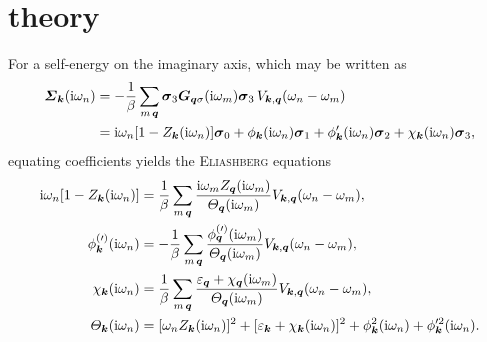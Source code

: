 
\chapter{ theory}

For a self-energy on the imaginary axis, which may be written as
%
\begin{align*}
    \boldsymbol {\varSigma}_{\boldsymbol k}(\mathrm i \omega_n) &= -\frac 1 \beta \sum_{m \, \boldsymbol q}
    \boldsymbol \sigma_3 \boldsymbol G_{\boldsymbol q \sigma}(\mathrm i \omega_m) \boldsymbol \sigma_3 \,
    V_{\boldsymbol k, \boldsymbol q}(\omega_n - \omega_m)
    \\
    &= \mathrm i \omega_n [1 - Z_{\boldsymbol k}(\mathrm i \omega_n)] \boldsymbol \sigma_0
    + \phi_{\boldsymbol k}(\mathrm i \omega_n) \boldsymbol \sigma_1
    + \phi'_{\boldsymbol k}(\mathrm i \omega_n) \boldsymbol \sigma_2
    + \chi_{\boldsymbol k}(\mathrm i \omega_n) \boldsymbol \sigma_3,
\end{align*}
%
equating coefficients yields the \textsc{Eliashberg} equations
%
\begin{align} \label{Eliashberg equations}
    \begin{split}
        \mathrm i \omega_n [1 - Z_{\boldsymbol k}(\mathrm i \omega_n)] &=
        \frac 1 \beta \sum_{m \, \boldsymbol q}
        \frac
            {\mathrm i \omega_m Z_{\boldsymbol q}(\mathrm i \omega_m)}
            {\varTheta_{\boldsymbol q}(\mathrm i \omega_m)}
        V_{\boldsymbol k, \boldsymbol q}(\omega_n - \omega_m),
        \\
        \phi^{(\prime)}_{\boldsymbol k}(\mathrm i \omega_n) &=
        -\frac 1 \beta \sum_{m \, \boldsymbol q}
        \frac
            {\phi^{(\prime)}_{\boldsymbol q}(\mathrm i \omega_m)}
            {\varTheta_{\boldsymbol q}(\mathrm i \omega_m)}
        V_{\boldsymbol k, \boldsymbol q}(\omega_n - \omega_m),
        \\
        \chi_{\boldsymbol k}(\mathrm i \omega_n) &=
        \frac 1 \beta \sum_{m \, \boldsymbol q}
        \frac
            {\varepsilon_{\boldsymbol q} + \chi_{\boldsymbol q}(\mathrm i \omega_m)}
            {\varTheta_{\boldsymbol q}(\mathrm i \omega_m)}
        V_{\boldsymbol k, \boldsymbol q}(\omega_n - \omega_m),
        \\
        \varTheta_{\boldsymbol k}(\mathrm i \omega_n) &=
        [\omega_n Z_{\boldsymbol k}(\mathrm i \omega_n)]^2
        + [\varepsilon_{\boldsymbol k} + \chi_{\boldsymbol k}(\mathrm i \omega_n)]^2
        + \phi_{\boldsymbol k}^2(\mathrm i \omega_n)
        + \phi'^2_{\boldsymbol k}(\mathrm i \omega_n).
    \end{split}
\end{align}
